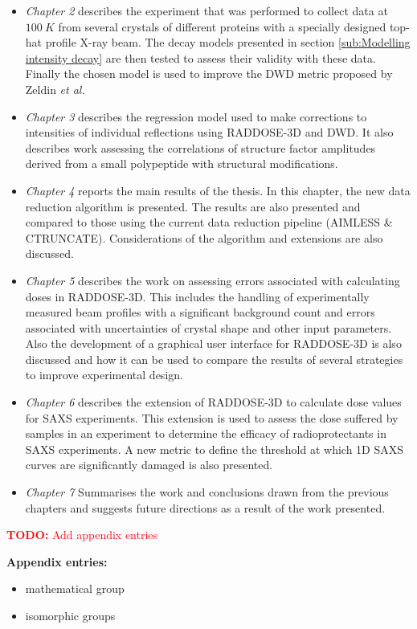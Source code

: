 	\begin{itemize}
        \item \textit{Chapter 2} describes the experiment that was performed to collect data at $100\ K$ from several crystals of different proteins with a specially designed top-hat profile X-ray beam.
		The decay models presented in section \ref{sub:Modelling intensity decay} are then tested to assess their validity with these data.
		Finally the chosen model is used to improve the DWD metric proposed by Zeldin \textit{et al.}
		\item \textit{Chapter 3} describes the regression model used to make corrections to intensities of individual reflections using RADDOSE-3D and DWD.
		It also describes work assessing the correlations of structure factor amplitudes derived from a small polypeptide with structural modifications.
		\item \textit{Chapter 4} reports the main results of the thesis. In this chapter, the new data reduction algorithm is presented.
		The results are also presented and compared to those using the current data reduction pipeline (AIMLESS \& CTRUNCATE).
		Considerations of the algorithm and extensions are also discussed.
		\item \textit{Chapter 5} describes the work on assessing errors associated with calculating doses in RADDOSE-3D.
		This includes the handling of experimentally measured beam profiles with a significant background count and errors associated with uncertainties of crystal shape and other input parameters.
		Also the development of a graphical user interface for RADDOSE-3D is also discussed and how it can be used to compare the results of several strategies to improve experimental design.
		\item \textit{Chapter 6} describes the extension of RADDOSE-3D to calculate dose values for SAXS experiments.
		This extension is used to assess the dose suffered by samples in an experiment to determine the efficacy of radioprotectants in SAXS experiments.
		A new metric to define the threshold at which 1D SAXS curves are significantly damaged is also presented.
        \textcolor{red}{
        }
		\item \textit{Chapter 7} Summarises the work and conclusions drawn from the previous chapters and suggests future directions as a result of the work presented.
    \end{itemize}

\textcolor{red}{
    \begin{myenumerate}
        \item \hypertarget{todo:Add appendix entries}{\textbf{TODO:} Add appendix entries}
    \end{myenumerate}
}

\textbf{Appendix entries:}
\newline
\begin{itemize}
    \item mathematical group
    \item isomorphic groups
\end{itemize}
